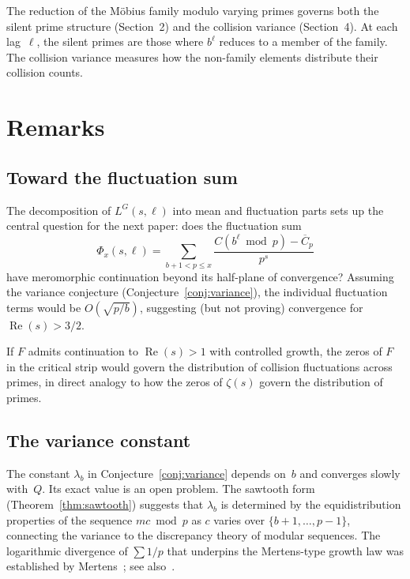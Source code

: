 \documentclass[12pt]{amsart}
\theoremstyle{definition}
\theoremstyle{remark}
\begin{document}
The reduction of the M\"obius family modulo varying primes
governs both the silent prime structure (Section~2) and the
collision variance (Section~4). At each lag~$\ell$, the silent
primes are those where $b^{\ell}$ reduces to a member of the
family. The collision variance measures how the non-family
elements distribute their collision counts.

\section{Remarks}

\subsection*{Toward the fluctuation sum}

The decomposition of $L^{G}(s, \ell)$ into mean and fluctuation
parts sets up the central question for the next paper: does the
fluctuation sum
\[
\Phi_x(s, \ell) = \sum_{b+1 < p \le x}
\frac{C(b^{\ell} \bmod p) - \overline{C}_p}{p^s}
\]
have meromorphic continuation beyond its half-plane of
convergence? Assuming the variance conjecture
(Conjecture~\ref{conj:variance}), the individual
fluctuation terms would be $O(\sqrt{p/b})$, suggesting
(but not proving) convergence for
$\operatorname{Re}(s) > 3/2$.

If $F$ admits continuation to $\operatorname{Re}(s) > 1$ with
controlled growth, the zeros of $F$ in the critical strip would
govern the distribution of collision fluctuations across primes,
in direct analogy to how the zeros of $\zeta(s)$ govern the
distribution of primes.

\subsection*{The variance constant}

The constant $\lambda_b$ in Conjecture~\ref{conj:variance} depends
on~$b$ and converges slowly with~$Q$. Its exact value is an open
problem. The sawtooth form (Theorem~\ref{thm:sawtooth}) suggests
that $\lambda_b$ is determined by the equidistribution properties
of the sequence $mc \bmod p$ as $c$ varies over
$\{b{+}1, \ldots, p{-}1\}$, connecting the variance to the
discrepancy theory of modular sequences.  The logarithmic
divergence of $\sum 1/p$ that underpins the Mertens-type
growth law was established by Mertens~\cite{mertens}; see
also~\cite{hardy}.
\end{document}
